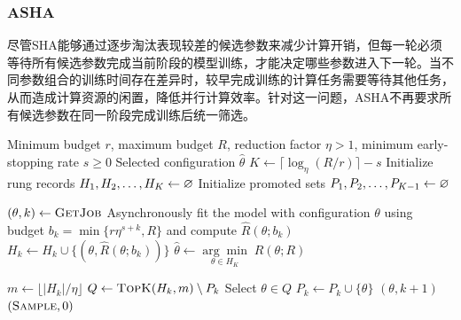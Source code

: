 \subsubsection{ASHA}
尽管SHA能够通过逐步淘汰表现较差的候选参数来减少计算开销，但每一轮必须等待所有候选参数完成当前阶段的模型训练，才能决定哪些参数进入下一轮。当不同参数组合的训练时间存在差异时，较早完成训练的计算任务需要等待其他任务，从而造成计算资源的闲置，降低并行计算效率。针对这一问题，\gls{ASHA}不再要求所有候选参数在同一阶段完成训练后统一筛选。
\begin{algorithm}[H]
	\caption{Asynchronous Successive Halving Algorithm (ASHA)}
	\label{alg:asha}
	\begin{algorithmic}[1]
		\Require Minimum budget $r$, maximum budget $R$, reduction factor $\eta>1$, minimum early-stopping rate $s\geqslant0$
		\Ensure Selected configuration $\hat{\theta}$
		\State $K\gets\lceil\log_\eta(R/r)\rceil-s$ 
		\State Initialize rung records $H_1, H_2, \dots, H_{K}\gets\varnothing$
		\State Initialize promoted sets $P_1, P_2, \dots, P_{K-1}\gets\varnothing$
		
		\State $(\theta,k)\gets\Call{GetJob}{}$
		\State Asynchronously fit the model with configuration $\theta$ using budget $b_k=\min\{r\eta^{s+k},R\}$ and compute $\hat{R}(\theta;b_k)$
		\EndFor
		\State $H_k\gets H_k\cup\{(\theta,\hat{R}(\theta;b_k))\}$
		\EndFor
		\EndWhile
		\State \Return $\hat{\theta}\gets\underset{\theta\in H_K}{\arg\min}\;\hat{R}(\theta;R)$
		
		 
		\State $m\gets\lfloor|H_k|/\eta\rfloor$
		\State $Q\gets\Call{TopK}{H_k,m}\setminus P_k$
		\State Select $\theta\in Q$
		\State $P_k\gets P_k\cup\{\theta\}$
		\State \Return $(\theta,k+1)$
		\EndIf
		\EndFor
		\State \Return $(\Call{Sample}{},0)$ 
		\EndFunction
	\end{algorithmic}
\end{algorithm}
